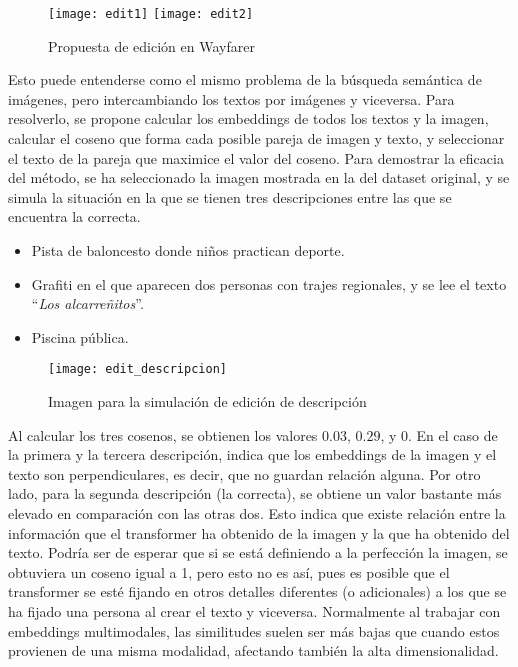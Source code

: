 		\begin{figure}[!h]
			\centering
			\texttt{[image: edit1]}\hfill
			\texttt{[image: edit2]}
			\caption{Propuesta de edición en Wayfarer}
			\label{fig:edit_wayfarer}
		\end{figure}
		
		Esto puede entenderse como el mismo problema de la búsqueda semántica de imágenes, pero intercambiando los textos por imágenes y viceversa. Para resolverlo, se propone calcular los embeddings de todos los textos y la imagen, calcular el coseno que forma cada posible pareja de imagen y texto, y seleccionar el texto de la pareja que maximice el valor del coseno. Para demostrar la eficacia del método, se ha seleccionado la imagen mostrada en la  del dataset original, y se simula la situación en la que se tienen tres descripciones entre las que se encuentra la correcta. 
		
		\begin{itemize}
			\item Pista de baloncesto donde niños practican deporte. 
			\item Grafiti en el que aparecen dos personas con trajes regionales, y se lee el texto ``\textit{Los alcarreñitos}''. 
			\item Piscina pública. 
		\end{itemize}
		
		\begin{figure}[!h]
			\centering
			\texttt{[image: edit\_descripcion]}
			\caption{Imagen para la simulación de edición de descripción}
			\label{fig:edit_descripcion}
		\end{figure}
		
		Al calcular los tres cosenos, se obtienen los valores $0.03$, $0.29$, y $0$. En el caso de la primera y la tercera descripción, indica que los embeddings de la imagen y el texto son perpendiculares, es decir, que no guardan relación alguna. Por otro lado, para la segunda descripción (la correcta), se obtiene un valor bastante más elevado en comparación con las otras dos. Esto indica que existe relación entre la información que el transformer ha obtenido de la imagen y la que ha obtenido del texto. Podría ser de esperar que si se está definiendo a la perfección la imagen, se obtuviera un coseno igual a 1, pero esto no es así, pues es posible que el transformer se esté fijando en otros detalles diferentes (o adicionales) a los que se ha fijado una persona al crear el texto y viceversa. Normalmente al trabajar con embeddings multimodales, las similitudes suelen ser más bajas que cuando estos provienen de una misma modalidad, afectando también la  alta dimensionalidad. 
	
		
					 
				